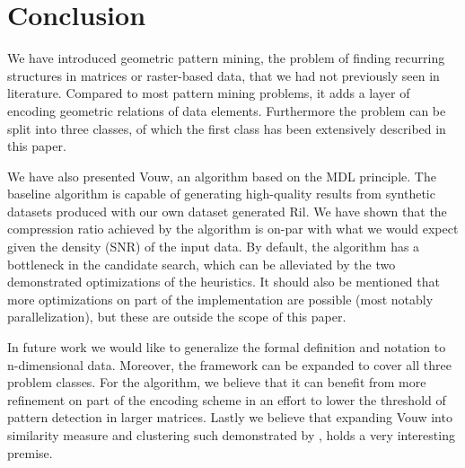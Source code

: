 \documentclass{llncs}
\begin{document}
\section{Conclusion}

We have introduced geometric pattern mining, the problem of finding recurring structures in matrices or raster-based data, that we had not previously seen in literature. Compared to most pattern mining problems, it adds a layer of encoding geometric relations of data elements. Furthermore the problem can be split into three classes, of which the first class has been extensively described in this paper.

We have also presented Vouw, an algorithm based on the MDL principle. The baseline algorithm is capable of generating high-quality results from synthetic datasets produced with our own dataset generated Ril. We have shown that the compression ratio achieved by the algorithm is on-par with what we would expect given the density (SNR) of the input data. By default, the algorithm has a bottleneck in the candidate search, which can be alleviated by the two demonstrated optimizations of the heuristics. It should also be mentioned that more optimizations on part of the implementation are possible (most notably parallelization), but these are outside the scope of this paper.

In future work we would like to generalize the formal definition and notation to n-dimensional data. Moreover, the framework can be expanded to cover all three problem classes. For the algorithm, we believe that it can benefit from more refinement on part of the encoding scheme in an effort to lower the threshold of pattern detection in larger matrices. Lastly we believe that expanding Vouw into similarity measure and clustering such demonstrated by \cite{campana2010compression}, holds a very interesting premise.
\end{document}
